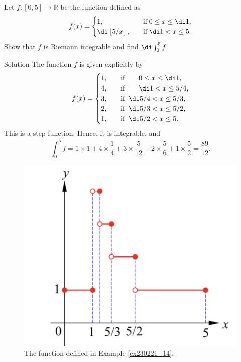 \begin{example}[label=ex230221_14]{}
Let $f:[0,5]\to\mathbb{R}$ be the function defined as 
\begin{align*}
f(x)=\begin{cases} 1,\quad &\text{if}\;0\leq x\leq \di 1,\\
\di\left\lfloor 5/x\right\rfloor,\quad &\text{if}\; \di 1< x\leq 5.\end{cases}
\end{align*}Show that $f$ is Riemann integrable and find $\di\int_0^5 f$. 
\end{example}


\begin{solution}{Solution}
The function $f$ is given explicitly by
\begin{align*}
f(x)=\begin{cases} 1,\quad &\text{if}\hspace{0.7cm} 0\leq x\leq \di 1,\\4,\quad &\text{if}\hspace{0.7cm} \di 1< x\leq 5/4,\\
3,\quad &\text{if}\;\; \di 5/4< x\leq 5/3,\\
2,\quad &\text{if}\; \;\di 5/3<x\leq 5/2,\\
1,\quad &\text{if}\; \;\di 5/2< x\leq 5.
 \end{cases}
\end{align*}
This is a step function. Hence, it is integrable, and
\[\int_0^5f=1\times 1+4\times \frac{1}{4}+3\times \frac{5}{12}+2\times\frac{5}{6}+1\times\frac{5}{2}=\frac{89}{12}.\]
\end{solution}
 \begin{figure}[ht]
\centering
\includegraphics[scale=0.2]{Picture43.png}
\caption{The   function defined in Example \ref{ex230221_14}.\fa}\label{figure43}
\end{figure}

